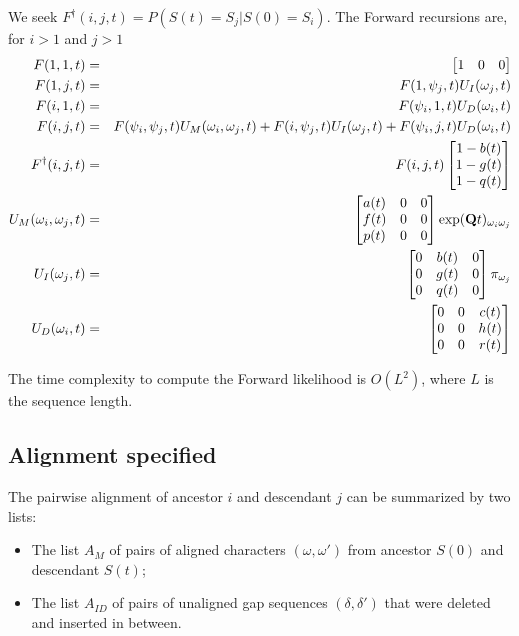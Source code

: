 \documentclass{article}
\begin{document}
We seek $F^\dagger(i,j,t) = P(S(t)=S_j|S(0)=S_i)$.
The Forward recursions are, for $i>1$ and $j>1$
\begin{eqnarray*}
F(1,1,t) & = & \begin{bmatrix} 1 & 0 & 0 \end{bmatrix}
\\
F(1,j,t) & = &
F(1,\psi_j,t) U_I(\omega_j,t)
\\
F(i,1,t) & = &
F(\psi_i,1,t) U_D(\omega_i,t)
\\
F(i,j,t) & = &
F(\psi_i,\psi_j,t) U_M(\omega_i,\omega_j,t)
+ F(i,\psi_j,t) U_I(\omega_j,t)
+ F(\psi_i,j,t) U_D(\omega_i,t)
\\
F^\dagger(i,j,t) & = & F(i,j,t) \begin{bmatrix}
1-b(t) \\
1-g(t) \\
1-q(t) \end{bmatrix}
\\
U_M(\omega_i,\omega_j,t) & = &
\begin{bmatrix}
a(t) & 0 & 0 \\
f(t) & 0 & 0 \\
p(t) & 0 & 0 
\end{bmatrix}
\exp({\bf Q}t)_{\omega_i \omega_j}
\\
U_I(\omega_j,t) & = &
\begin{bmatrix}
0 & b(t) & 0 \\
0 & g(t) & 0 \\
0 & q(t) & 0 
\end{bmatrix}
\pi_{\omega_j}
\\
U_D(\omega_i,t) & = &
\begin{bmatrix}
0 & 0 & c(t) \\
0 & 0 & h(t) \\
0 & 0 & r(t) 
\end{bmatrix}
\end{eqnarray*}

The time complexity to compute the Forward likelihood is $O(L^2)$,
where $L$ is the sequence length.

\subsection{Alignment specified}

The pairwise alignment of ancestor $i$ and descendant $j$ can be summarized by two lists:
\begin{itemize}
    \item The list $A_M$ of pairs of aligned characters $(\omega,\omega')$ from ancestor $S(0)$ and descendant $S(t)$;
    \item The list $A_{ID}$ of pairs of unaligned gap sequences $(\delta,\delta')$ that were deleted and inserted in between.
\end{itemize}
\end{document}
